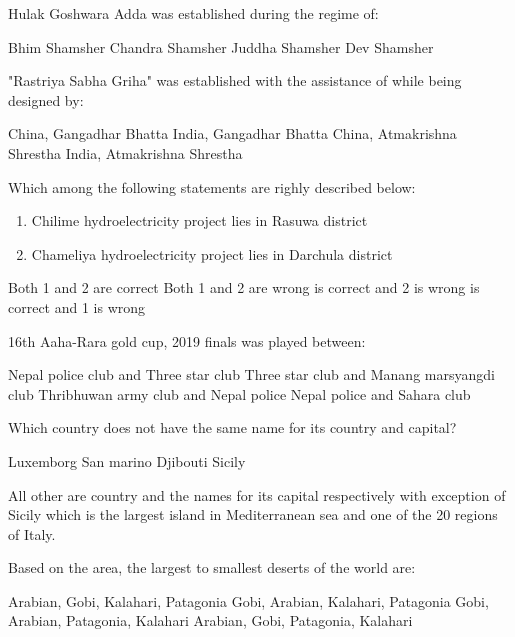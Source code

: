 \begin{questions}
\question Hulak Goshwara Adda was established during the regime of:
  \begin{choices}
  \choice Bhim Shamsher
  \CorrectChoice Chandra Shamsher
  \choice Juddha Shamsher
  \choice Dev Shamsher
  \end{choices}

\question "Rastriya Sabha Griha" was established with the assistance of \fillin[][3.5cm] while being designed by:
  \begin{choices}
  \CorrectChoice China, Gangadhar Bhatta
  \choice India, Gangadhar Bhatta
  \choice China, Atmakrishna Shrestha
  \choice India, Atmakrishna Shrestha
  \end{choices}

\question Which among the following statements are righly described below:
  \begin{enumerate}
  \item Chilime hydroelectricity project lies in Rasuwa district
  \item Chameliya hydroelectricity project lies in Darchula district
  \end{enumerate}
  \begin{choices}
  \CorrectChoice Both 1 and 2 are correct
  \choice Both 1 and 2 are wrong
   is correct and 2 is wrong
   is correct and 1 is wrong
  \end{choices}

\question 16th Aaha-Rara gold cup, 2019 finals was played between:
  \begin{choices}
  \CorrectChoice Nepal police club and Three star club
  \choice Three star club and Manang marsyangdi club
  \choice Thribhuwan army club and Nepal police
  \choice Nepal police and Sahara club
  \end{choices}

\question Which country does not have the same name for its country and capital?
  \begin{choices}
  \choice Luxemborg
  \choice San marino
  \choice Djibouti
  \CorrectChoice Sicily
  \end{choices}
  \begin{solution}
      All other are country and the names for its capital respectively with exception of Sicily which is the largest island in Mediterranean sea and one of the 20 regions of Italy.
  \end{solution}

\question Based on the area, the largest to smallest deserts of the world are:
  \begin{choices}
  \CorrectChoice Arabian, Gobi, Kalahari, Patagonia
  \choice Gobi, Arabian, Kalahari, Patagonia
  \choice Gobi, Arabian, Patagonia, Kalahari
  \choice Arabian, Gobi, Patagonia, Kalahari
  \end{choices}



\end{questions}
